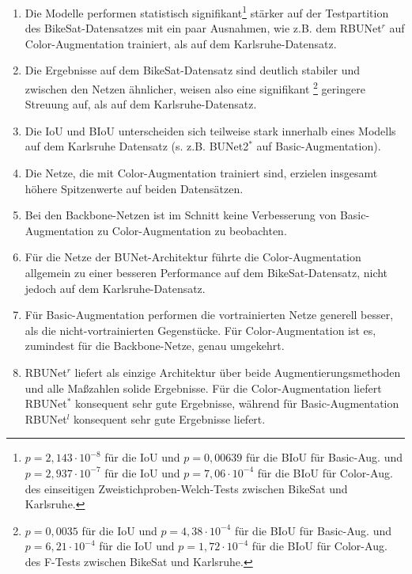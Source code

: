 \begin{enumerate}
	\item Die Modelle performen statistisch signifikant\footnote{
		$p = 2,143\cdot 10^{-8}$ für die IoU und $p = 0,00639$ für die BIoU für Basic-Aug. und 
		$p = 2,937\cdot 10^{-7}$ für die IoU und $p = 7,06 \cdot 10^{-4}$ für die BIoU für Color-Aug.
		des einseitigen Zweistichproben-Welch-Tests zwischen BikeSat und Karlsruhe. 
	} stärker auf der Testpartition des BikeSat-Datensatzes mit ein paar Ausnahmen, wie z.B. dem RBUNet$^r$ auf Color-Augmentation trainiert, 
	als auf dem Karlsruhe-Datensatz. 
	\item Die Ergebnisse auf dem BikeSat-Datensatz sind deutlich stabiler und zwischen den Netzen ähnlicher, weisen also eine signifikant \footnote{
		$p = 0,0035$ für die IoU und $p = 4,38\cdot 10^{-4}$ für die BIoU für Basic-Aug. und 
		$p = 6,21\cdot 10^{-4}$ für die IoU und $p = 1,72 \cdot 10^{-4}$ für die BIoU für Color-Aug.
		des F-Tests zwischen BikeSat und Karlsruhe. 
	} geringere Streuung auf, als auf dem Karlsruhe-Datensatz.
	\item Die \ac{IoU} und \ac{BIoU} unterscheiden sich teilweise stark innerhalb eines Modells auf dem Karlsruhe Datensatz (s. z.B. BUNet2$^*$ auf Basic-Augmentation).
	\item Die Netze, die mit Color-Augmentation trainiert sind, erzielen insgesamt höhere Spitzenwerte auf beiden Datensätzen. 
	\item Bei den Backbone-Netzen ist im Schnitt keine Verbesserung von Basic-Augmentation zu Color-Augmentation zu beobachten. 
	\item Für die Netze der BUNet-Architektur führte die Color-Augmentation allgemein zu einer besseren Performance auf dem BikeSat-Datensatz, nicht jedoch auf dem Karlsruhe-Datensatz.
	\item Für Basic-Augmentation performen die vortrainierten Netze generell besser, als die nicht-vortrainierten Gegenstücke. 
	Für Color-Augmentation ist es, zumindest für die Backbone-Netze, genau umgekehrt. 
	\item RBUNet$^r$ liefert als einzige Architektur über beide Augmentierungsmethoden und alle Maßzahlen solide Ergebnisse. 
	Für die Color-Augmentation liefert RBUNet$^*$ konsequent sehr gute Ergebnisse, während für Basic-Augmentation RBUNet$^l$ konsequent sehr gute Ergebnisse liefert.
\end{enumerate}



